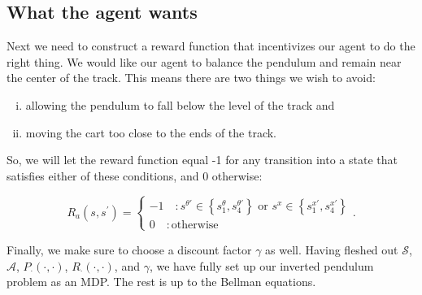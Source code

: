 \documentclass[12pt]{article}
\begin{document}

\subsection{What the agent wants}

Next we need to construct a reward function that incentivizes our agent to do the right thing. We would like our agent to balance the pendulum and remain near the center of the track. This means there are two things we wish to avoid:

\begin{enumerate}[(i)]
\item{allowing the pendulum to fall below the level of the track and}
\item{moving the cart too close to the ends of the track.}
\end{enumerate}

So, we will let the reward function equal -1 for any transition into a state that satisfies either of these conditions, and 0 otherwise:

\begin{equation}
R_a(s, s^\prime) = \left\{
\begin{array}{lr}
-1 \quad : s^{\theta\prime} \in \left\{s_1^\theta, s_4^{\theta\prime} \right\}\mbox{ or }s^x \in \left\{s_1^{x\prime}, s_4^{x\prime} \right\} \\
0 \quad : \mbox{otherwise}
\end{array}
\right.
.
\end{equation}

Finally, we make sure to choose a discount factor $\gamma$ as well. Having fleshed out $\mathscr{S}$, $\mathscr{A}$, $P_\cdot(\cdot, \cdot)$, $R_\cdot(\cdot, \cdot)$, and $\gamma$, we have fully set up our inverted pendulum problem as an MDP. The rest is up to the Bellman equations.
\end{document}
